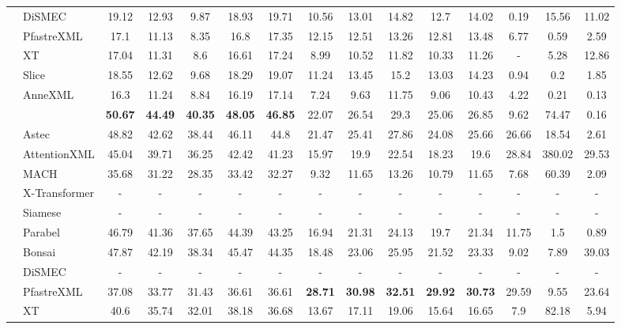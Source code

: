 \begin{table*}
{\begin{tabular}{@{}c|l|ccccc|ccccc|ccc@{}}
	& DiSMEC	 & 19.12	 & 12.93	 & 9.87	 & 18.93	 & 19.71	 & 10.56	 & 13.01	 & 14.82	 & 12.7	 & 14.02	 & 0.19	 & 15.56	 & 11.02\\
	& PfastreXML	 & 17.1	 & 11.13	 & 8.35	 & 16.8	 & 17.35	 & 12.15	 & 12.51	 & 13.26	 & 12.81	 & 13.48	 & 6.77	 & 0.59	 & 2.59\\
	& XT	 & 17.04	 & 11.31	 & 8.6	 & 16.61	 & 17.24	 & 8.99	 & 10.52	 & 11.82	 & 10.33	 & 11.26	 & -	 & 5.28	 & 12.86\\
	& Slice	 & 18.55	 & 12.62	 & 9.68	 & 18.29	 & 19.07	 & 11.24	 & 13.45	 & 15.2	 & 13.03	 & 14.23	 & 0.94	 & 0.2	 & 1.85\\
	& AnneXML	 & 16.3	 & 11.24	 & 8.84	 & 16.19	 & 17.14	 & 7.24	 & 9.63	 & 11.75	 & 9.06	 & 10.43	 & 4.22	 & 0.21	 & 0.13\\
	 \midrule
	\multirow{11}{*}{\textbf{\rotatebox{90}{LF-AmazonTitles-1.3M}}}	& \alg	 & \textbf{50.67}	 & \textbf{44.49}	 & \textbf{40.35}	 & \textbf{48.05}	 & \textbf{46.85}	 & 22.07	 & 26.54	 & 29.3	 & 25.06	 & 26.85	 & 9.62	 & 74.47	 & 0.16\\
	& Astec	 & 48.82	 & 42.62	 & 38.44	 & 46.11	 & 44.8	 & 21.47	 & 25.41	 & 27.86	 & 24.08	 & 25.66	 & 26.66	 & 18.54	 & 2.61\\
	& AttentionXML	 & 45.04	 & 39.71	 & 36.25	 & 42.42	 & 41.23	 & 15.97	 & 19.9	 & 22.54	 & 18.23	 & 19.6	 & 28.84	 & 380.02	 & 29.53\\
	& MACH	 & 35.68	 & 31.22	 & 28.35	 & 33.42	 & 32.27	 & 9.32	 & 11.65	 & 13.26	 & 10.79	 & 11.65	 & 7.68	 & 60.39	 & 2.09\\
	& X-Transformer	 & -	 & -	 & -	 & -	 & -	 & -	 & -	 & -	 & -	 & -	 & -	 & -	 & -\\
	& Siamese	 & -	 & -	 & -	 & -	 & -	 & -	 & -	 & -	 & -	 & -	 & -	 & -	 & -\\
	& Parabel	 & 46.79	 & 41.36	 & 37.65	 & 44.39	 & 43.25	 & 16.94	 & 21.31	 & 24.13	 & 19.7	 & 21.34	 & 11.75	 & 1.5	 & 0.89\\
	& Bonsai	 & 47.87	 & 42.19	 & 38.34	 & 45.47	 & 44.35	 & 18.48	 & 23.06	 & 25.95	 & 21.52	 & 23.33	 & 9.02	 & 7.89	 & 39.03\\
	& DiSMEC	 & -	 & -	 & -	 & -	 & -	 & -	 & -	 & -	 & -	 & -	 & -	 & -	 & -\\
	& PfastreXML	 & 37.08	 & 33.77	 & 31.43	 & 36.61	 & 36.61	 & \textbf{28.71}	 & \textbf{30.98}	 & \textbf{32.51}	 & \textbf{29.92}	 & \textbf{30.73}	 & 29.59	 & 9.55	 & 23.64\\
	& XT	 & 40.6	 & 35.74	 & 32.01	 & 38.18	 & 36.68	 & 13.67	 & 17.11	 & 19.06	 & 15.64	 & 16.65	 & 7.9	 & 82.18	 & 5.94\\

\end{tabular}}
\end{table*}
